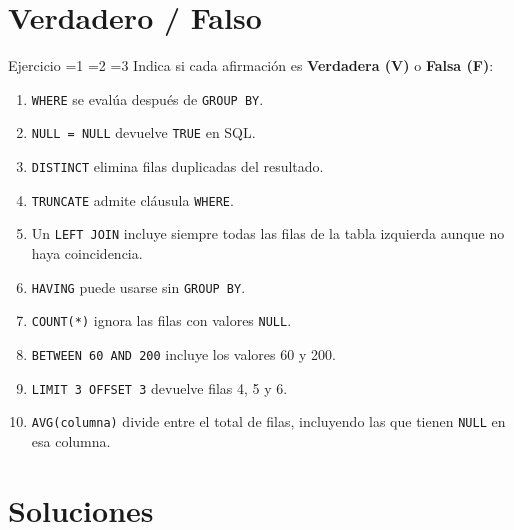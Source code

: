 \documentclass[12pt, a4paper]{article}
\newcommand{\blank}[1][4cm]{\underline{\hspace{#1}}}
\newcommand{\estrella}{{\color{Goldenrod}\faStarSolid}}
\newcommand{\estrellavacia}{{\color{gray!45}\faStarSolid}}
\newcommand{\nivel}[1]{%
  \ifnum#1=1\estrella\estrellavacia\estrellavacia\fi
  \ifnum#1=2\estrella\estrella\estrellavacia\fi
  \ifnum#1=3\estrella\estrella\estrella\fi
}
\newcounter{numej}
\newcommand{\ej}{\stepcounter{numej}\thenumej}
\begin{document}
\section{Verdadero / Falso}

\begin{ejercicio}{Ejercicio \ej}{\nivel{1}}
Indica si cada afirmación es \textbf{Verdadera (V)} o
\textbf{Falsa (F)}:

\vspace{4pt}
\begin{enumerate}[label=\arabic*., leftmargin=1.5em, itemsep=8pt]
  \item \blank[1.2cm] \texttt{WHERE} se evalúa después de \texttt{GROUP BY}.
  \item \blank[1.2cm] \texttt{NULL = NULL} devuelve \texttt{TRUE} en SQL.
  \item \blank[1.2cm] \texttt{DISTINCT} elimina filas duplicadas del resultado.
  \item \blank[1.2cm] \texttt{TRUNCATE} admite cláusula \texttt{WHERE}.
  \item \blank[1.2cm] Un \texttt{LEFT JOIN} incluye siempre todas las filas
        de la tabla izquierda aunque no haya coincidencia.
  \item \blank[1.2cm] \texttt{HAVING} puede usarse sin \texttt{GROUP BY}.
  \item \blank[1.2cm] \texttt{COUNT(*)} ignora las filas con valores \texttt{NULL}.
  \item \blank[1.2cm] \texttt{BETWEEN 60 AND 200} incluye los valores 60 y 200.
  \item \blank[1.2cm] \texttt{LIMIT 3 OFFSET 3} devuelve filas 4, 5 y 6.
  \item \blank[1.2cm] \texttt{AVG(columna)} divide entre el total de filas,
        incluyendo las que tienen \texttt{NULL} en esa columna.
\end{enumerate}
\end{ejercicio}

\newpage
\section*{Soluciones}
\end{document}

